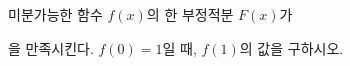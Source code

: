 미분가능한 함수 $f(x)$의 한 부정적분 $F(x)$가 \par\smallskip{}\par\smallskip\noindent 을 만족시킨다. $f(0)=1$일 때, $f(1)$의 값을 구하시오.
